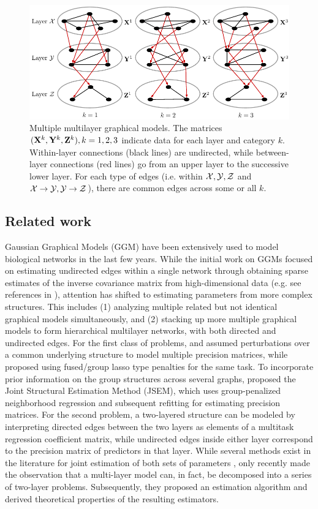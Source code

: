 \begin{figure}
\centering
\includegraphics[]{multi2layer}
\caption{Multiple multilayer graphical models. The matrices $({\mathbf{X}}^k, {\mathbf{Y}}^k, {\mathbf{Z}}^k), k = 1,2,3$ indicate data for each layer and category $k$. Within-layer connections (black lines) are undirected, while between-layer connections (red lines) go from an upper layer to the successive lower layer. For each type of edges (i.e. within ${\cal{X}}, {\cal{Y}}, {\cal{Z}}$ and ${\cal{X}} \rightarrow {\cal{Y}}, {\cal{Y}} \rightarrow {\cal{Z}}$), there are common edges across some or all $k$. }
\label{fig:multi2layer}
\end{figure}

\subsection{Related work}
Gaussian Graphical Models (GGM) have been extensively used to model biological networks in the last few years. While the initial work on GGMs focused on estimating undirected edges within a single network through obtaining sparse estimates of the inverse covariance matrix from high-dimensional data (e.g. see references in \citet{BuhlmannvandeGeer11}), attention has shifted to estimating parameters from more complex structures. This includes (1) analyzing multiple related but not identical graphical models simultaneously, and (2) stacking up more multiple graphical models to form hierarchical multilayer networks, with both directed and undirected edges. For the first class of problems, \citet{GuoEtal11} and \citet{XieLiuValdar16} assumed perturbations over a common underlying structure to model multiple precision matrices, while \citet{DanaherEtal14} proposed using fused/group lasso type penalties for the same task. To incorporate prior information on the group structures across several graphs, \citet{MaMichailidis15} proposed the Joint Structural Estimation Method (JSEM), which uses group-penalized neighborhood regression and subsequent refitting for estimating precision matrices.
For the second problem, a two-layered structure can be modeled by interpreting directed edges between the two layers as elements of a multitask regression coefficient matrix, while undirected edges inside either layer correspond to the precision matrix of predictors in that layer. While several methods exist in the literature for joint estimation of both sets of parameters \citep{LeeLiu12, CaiEtal12}, only recently \citet{LinEtal16} made the observation that a multi-layer model can, in fact, be decomposed into a series of two-layer problems. Subsequently, they proposed an estimation algorithm and derived theoretical properties of the resulting estimators.

